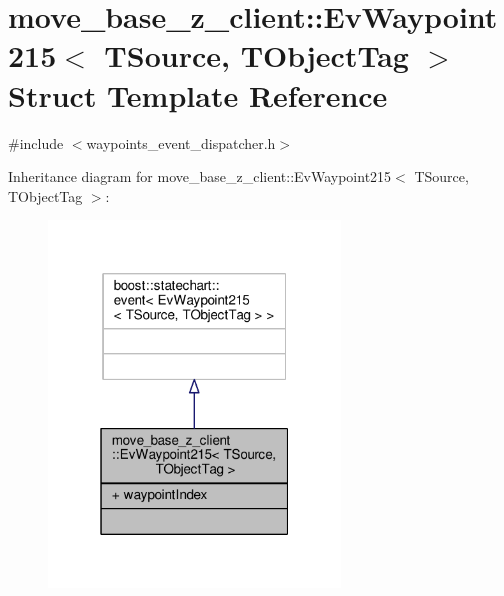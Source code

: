 \hypertarget{structmove__base__z__client_1_1EvWaypoint215}{}\section{move\+\_\+base\+\_\+z\+\_\+client\+:\+:Ev\+Waypoint215$<$ T\+Source, T\+Object\+Tag $>$ Struct Template Reference}
\label{structmove__base__z__client_1_1EvWaypoint215}


{\ttfamily \#include $<$waypoints\+\_\+event\+\_\+dispatcher.\+h$>$}



Inheritance diagram for move\+\_\+base\+\_\+z\+\_\+client\+:\+:Ev\+Waypoint215$<$ T\+Source, T\+Object\+Tag $>$\+:\nopagebreak
\begin{figure}[H]
\begin{center}
\leavevmode
\includegraphics[width=220pt]{structmove__base__z__client_1_1EvWaypoint215__inherit__graph}
\end{center}
\end{figure}



